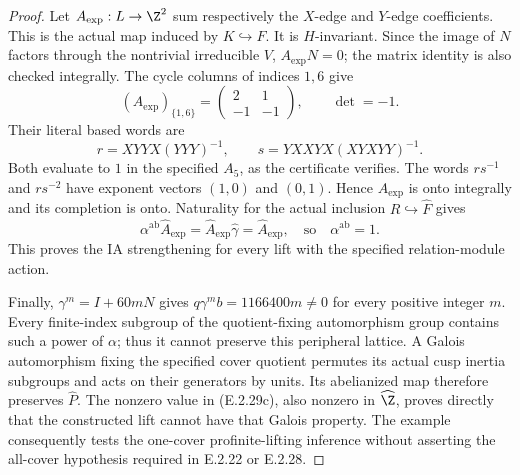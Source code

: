 \begin{proof}
Let \(A_{\mathrm{exp}}:L\to\Z^2\) sum respectively
the \(X\)-edge and \(Y\)-edge coefficients. This is the
actual map induced by \(K\hookrightarrow F\).
It is \(H\)-invariant. Since the image of \(N\) factors
through the nontrivial irreducible \(V\),
\(A_{\mathrm{exp}}N=0\); the matrix identity is also
checked integrally. The cycle columns of indices
\(1,6\) give
\[
 (A_{\mathrm{exp}})_{\{1,6\}}
 =\begin{pmatrix}2&1\\-1&-1\end{pmatrix},
 \qquad\det=-1.
 \tag{E.2.29u}
\]
Their literal based words are
\[
 r=XYYX(YYY)^{-1},\qquad
 s=YXXYX(XYXYY)^{-1}.
 \tag{E.2.29v}
\]
Both evaluate to \(1\) in the specified \(A_5\), as
the certificate verifies. The words \(rs^{-1}\)
and \(rs^{-2}\) have exponent vectors \((1,0)\)
and \((0,1)\). Hence \(A_{\mathrm{exp}}\) is onto
integrally and its completion is onto. Naturality for
the actual inclusion \(R\hookrightarrow\widehat F\) gives
\[
 \alpha^{\mathrm{ab}}\widehat A_{\mathrm{exp}}
 =\widehat A_{\mathrm{exp}}\widehat\gamma
 =\widehat A_{\mathrm{exp}},
 \quad\text{so}\quad \alpha^{\mathrm{ab}}=1 .
 \tag{E.2.29w}
\]
This proves the IA strengthening for every lift with
the specified relation-module action.

Finally, \(\gamma^m=I+60mN\) gives
\(q\gamma^m b=1166400m\ne0\) for every positive integer
\(m\). Every finite-index subgroup of the quotient-fixing
automorphism group contains such a power of \(\alpha\);
thus it cannot preserve this peripheral lattice.
A Galois automorphism fixing the specified cover quotient
permutes its actual cusp inertia subgroups and acts on
their generators by units. Its abelianized map therefore
preserves \(\widehat P\). The nonzero value in
(E.2.29c), also nonzero in \(\widehat\Z\), proves
directly that the constructed lift cannot have that
Galois property. The example consequently tests the
one-cover profinite-lifting inference without asserting
the all-cover hypothesis required in E.2.22 or E.2.28.
\end{proof}


